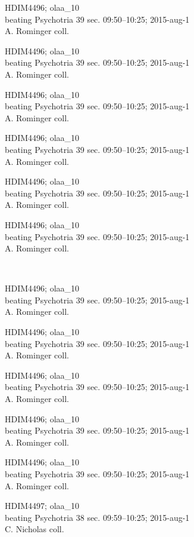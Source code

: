 \documentclass[2pt]{extarticle}
\begin{document}
\noindent
\parbox{0.16\textwidth}{\tiny \raggedright \rule[-0.3\baselineskip]{0pt}{10pt}HDIM4496; olaa\_10\\ beating Psychotria 39 sec. 09:50--10:25; 2015-aug-1\\ A. Rominger coll.}
\parbox{0.16\textwidth}{\tiny \raggedright \rule[-0.3\baselineskip]{0pt}{10pt}HDIM4496; olaa\_10\\ beating Psychotria 39 sec. 09:50--10:25; 2015-aug-1\\ A. Rominger coll.}
\parbox{0.16\textwidth}{\tiny \raggedright \rule[-0.3\baselineskip]{0pt}{10pt}HDIM4496; olaa\_10\\ beating Psychotria 39 sec. 09:50--10:25; 2015-aug-1\\ A. Rominger coll.}
\parbox{0.16\textwidth}{\tiny \raggedright \rule[-0.3\baselineskip]{0pt}{10pt}HDIM4496; olaa\_10\\ beating Psychotria 39 sec. 09:50--10:25; 2015-aug-1\\ A. Rominger coll.}
\parbox{0.16\textwidth}{\tiny \raggedright \rule[-0.3\baselineskip]{0pt}{10pt}HDIM4496; olaa\_10\\ beating Psychotria 39 sec. 09:50--10:25; 2015-aug-1\\ A. Rominger coll.}
\parbox{0.16\textwidth}{\tiny \raggedright \rule[-0.3\baselineskip]{0pt}{10pt}HDIM4496; olaa\_10\\ beating Psychotria 39 sec. 09:50--10:25; 2015-aug-1\\ A. Rominger coll.} \\ 
\vspace{0.001in} 

\noindent
\parbox{0.16\textwidth}{\tiny \raggedright \rule[-0.3\baselineskip]{0pt}{10pt}HDIM4496; olaa\_10\\ beating Psychotria 39 sec. 09:50--10:25; 2015-aug-1\\ A. Rominger coll.}
\parbox{0.16\textwidth}{\tiny \raggedright \rule[-0.3\baselineskip]{0pt}{10pt}HDIM4496; olaa\_10\\ beating Psychotria 39 sec. 09:50--10:25; 2015-aug-1\\ A. Rominger coll.}
\parbox{0.16\textwidth}{\tiny \raggedright \rule[-0.3\baselineskip]{0pt}{10pt}HDIM4496; olaa\_10\\ beating Psychotria 39 sec. 09:50--10:25; 2015-aug-1\\ A. Rominger coll.}
\parbox{0.16\textwidth}{\tiny \raggedright \rule[-0.3\baselineskip]{0pt}{10pt}HDIM4496; olaa\_10\\ beating Psychotria 39 sec. 09:50--10:25; 2015-aug-1\\ A. Rominger coll.}
\parbox{0.16\textwidth}{\tiny \raggedright \rule[-0.3\baselineskip]{0pt}{10pt}HDIM4496; olaa\_10\\ beating Psychotria 39 sec. 09:50--10:25; 2015-aug-1\\ A. Rominger coll.}
\parbox{0.16\textwidth}{\tiny \raggedright \rule[-0.3\baselineskip]{0pt}{10pt}HDIM4497; olaa\_10\\ beating Psychotria 38 sec. 09:59--10:25; 2015-aug-1\\ C. Nicholas coll.} \\ 
\vspace{0.001in} 
\end{document}
